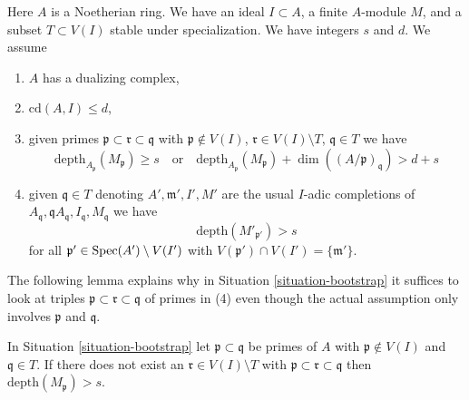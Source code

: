 \begin{situation}
\label{situation-bootstrap}
Here $A$ is a Noetherian ring. We have an ideal $I \subset A$,
a finite $A$-module $M$, and a subset $T \subset V(I)$ stable under
specialization. We have integers $s$ and $d$. We assume
\begin{enumerate}
\item[(1)] $A$ has a dualizing complex,
\item[(3)] $\text{cd}(A, I) \leq d$,
\item[(4)] given primes $\mathfrak p \subset \mathfrak r \subset \mathfrak q$
with $\mathfrak p \not \in V(I)$,
$\mathfrak r \in V(I) \setminus T$,
$\mathfrak q \in T$ we have
$$
\text{depth}_{A_\mathfrak p}(M_\mathfrak p) \geq s
\quad\text{or}\quad
\text{depth}_{A_\mathfrak p}(M_\mathfrak p) +
\dim((A/\mathfrak p)_\mathfrak q) > d + s
$$
\item[(6)] given $\mathfrak q \in T$ denoting
$A', \mathfrak m', I', M'$ are the usual $I$-adic completions
of $A_\mathfrak q, \mathfrak qA_\mathfrak q, I_\mathfrak q, M_\mathfrak q$
we have
$$
\text{depth}(M'_{\mathfrak p'}) > s
$$
for all $\mathfrak p' \in \mathop{\mathrm{Spec}}(A') \setminus V(I')$ with
$V(\mathfrak p') \cap V(I') = \{\mathfrak m'\}$.
\end{enumerate}
\end{situation}

\noindent
The following lemma explains why in Situation \ref{situation-bootstrap}
it suffices to look at triples
$\mathfrak p \subset \mathfrak r \subset \mathfrak q$ of primes in (4)
even though the actual assumption only involves $\mathfrak p$ and $\mathfrak q$.

\begin{lemma}
\label{lemma-helper-bootstrap}
In Situation \ref{situation-bootstrap} let $\mathfrak p \subset \mathfrak q$
be primes of $A$ with $\mathfrak p \not \in V(I)$ and
$\mathfrak q \in T$. If there does not exist an
$\mathfrak r \in V(I) \setminus T$ with
$\mathfrak p \subset \mathfrak r \subset \mathfrak q$
then $\text{depth}(M_\mathfrak p) > s$.
\end{lemma}

